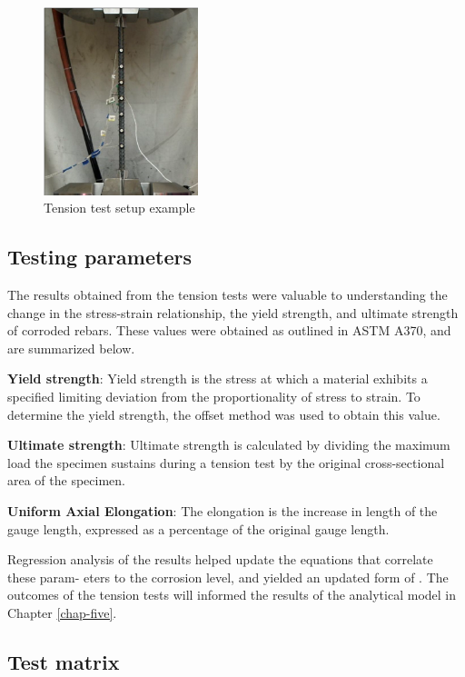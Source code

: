 \begin{figure}[htbp]
	\centering
	\includegraphics[width=0.4\textwidth]{Chapter-3/figs/TensionTest}
	\caption{Tension test setup example\cite{Overby2016}}
	\label{fig:TensionTest}
\end{figure}

\subsection{Testing parameters}
The results obtained from the tension tests were valuable to understanding the change in the stress-strain relationship, the yield strength, and ultimate strength of corroded rebars. These values were obtained as outlined in ASTM A370, and are summarized below.

\textbf{Yield strength}: Yield strength is the stress at which a material exhibits a specified limiting deviation from the proportionality of stress to strain. To determine the yield strength, the offset method was used to obtain this value.

\textbf{Ultimate strength}: Ultimate strength is calculated by dividing the maximum load the specimen sustains during a tension test by the original cross-sectional area of the specimen.

\textbf{Uniform Axial Elongation}: The elongation is the increase in length of the gauge length, expressed as a percentage of the original gauge length.

Regression analysis of the results helped update the equations that correlate these param- eters to the corrosion level, and yielded an updated form of . The outcomes of the tension tests will informed the results of the analytical model in Chapter \ref{chap-five}.

\subsection{Test matrix}

